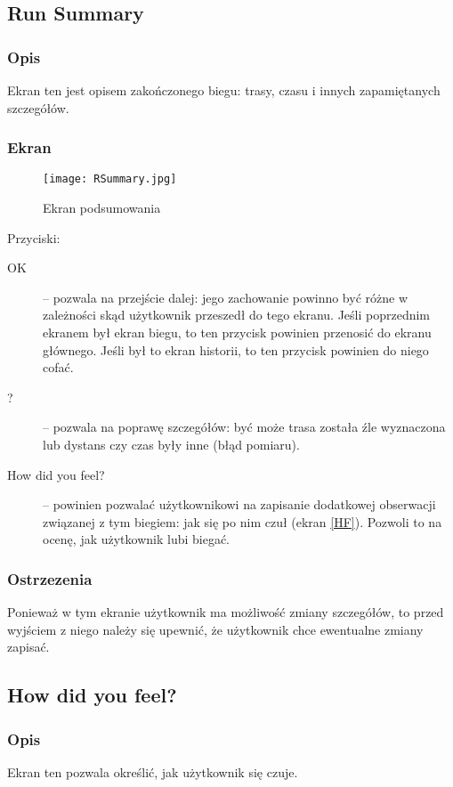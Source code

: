 \subsection{Run Summary}
\subsubsection{Opis}
\noindent Ekran ten jest opisem zakończonego biegu: trasy, czasu i innych zapamiętanych szczegółów.
\subsubsection{Ekran}
\begin{figure}[b!]
  \texttt{[image: RSummary.jpg]}
  \caption{Ekran podsumowania}
  \label{RS}
\end{figure}
Przyciski:\\
\begin{description}
  \item[OK] -- pozwala na przejście dalej: jego zachowanie powinno być różne w zależności skąd użytkownik przeszedł do tego ekranu. Jeśli poprzednim ekranem był ekran biegu, to ten przycisk powinien przenosić do ekranu głównego. Jeśli był to ekran historii, to ten przycisk powinien do niego cofać.
  \item[?] -- pozwala na poprawę szczegółów: być może trasa została źle wyznaczona lub dystans czy czas były inne (błąd pomiaru).
  \item[How did you feel?] -- powinien pozwalać użytkownikowi na zapisanie dodatkowej obserwacji związanej z tym biegiem: jak się po nim czuł (ekran \ref{HF}). Pozwoli to na ocenę, jak użytkownik lubi biegać.
\end{description}
\subsubsection{Ostrzezenia}
\noindent Ponieważ w tym ekranie użytkownik ma możliwość zmiany szczegółów, to przed wyjściem z niego należy się upewnić, że użytkownik chce ewentualne zmiany zapisać.
\subsection{How did you feel?}
\subsubsection{Opis}
\noindent Ekran ten pozwala określić, jak użytkownik się czuje.
